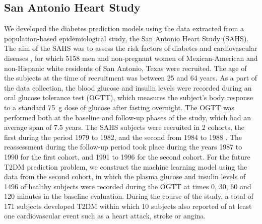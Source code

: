 \documentclass[journal,comsoc]{IEEEtran}
\begin{document}
\subsection{San Antonio Heart Study}
%
We developed the diabetes prediction models using the data extracted from a population-based epidemiological study, the San Antonio Heart Study (SAHS). The aim of the SAHS was to assess the risk factors of diabetes and cardiovascular diseases \cite{burke_rapid_1999, lorenzo_trend_2006}, for which \num[group-minimum-digits=4, group-separator = {,}]{5158} men and non-pregnant women of Mexican-American and non-Hispanic white residents of San Antonio, Texas were recruited. The age of the subjects at the time of recruitment was between \num{25} and \num{64} years. As a part of the data collection, the blood glucose and insulin levels were recorded during an oral glucose tolerance test (OGTT), which measures the subject's body response to a standard \SI{75}{\gram} dose of glucose after fasting overnight. The OGTT was performed both at the baseline and follow-up phases of the study, which had an average span of \num{7.5} years. The SAHS subjects were recruited in \num{2} cohorts, the first during the period \num{1979} to \num{1982}, and the second from \num{1984} to \num{1988} \cite{haffner_hyperinsulinemia_1986}. The reassessment during the follow-up period took place during the years \num{1987} to \num{1990} for the first cohort, and \num{1991} to \num{1996} for the second cohort. For the future T2DM prediction problem, we construct the machine learning model using the data from the second cohort, in which the plasma glucose and insulin levels of \num[group-minimum-digits=4, group-separator = {,}]{1496} of healthy subjects were recorded during the OGTT at times \num{0}, \num{30}, \num{60} and \num{120} minutes in the baseline evaluation. During the course of the study, a total of \num{171} subjects developed T2DM within which \num{10} subjects also reported of at least one cardiovascular event such as a heart attack, stroke or angina.
\end{document}
